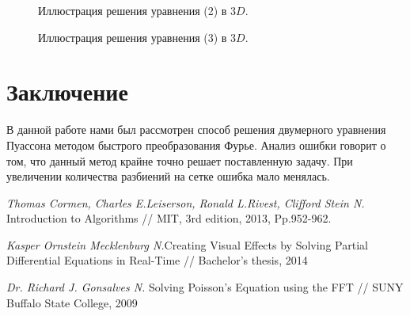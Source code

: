 \documentclass[a4paper,12pt]{article}
\theoremstyle{plain} %
\theoremstyle{definition} %
\theoremstyle{remark} %
\theoremstyle{definition}
\theoremstyle{definition}
\begin{document}
		 	\begin{figure}[H]
		 	\caption{Иллюстрация решения уравнения (2) в $\textit{3D}$.}
		 \end{figure}
		 
		 	\begin{figure}[H]
		 	\caption{Иллюстрация решения уравнения (3) в $\textit{3D}$.}
		 \end{figure}
		 
	\newpage
	\section{Заключение}
	
	В данной работе нами был рассмотрен способ решения двумерного уравнения Пуассона методом быстрого преобразования Фурье. Анализ ошибки говорит о том, что данный метод крайне точно решает поставленную задачу. При увеличении количества разбиений на сетке ошибка мало менялась.  
	
	\begin{thebibliography}{3} 
		 \textit{Thomas Cormen, Charles E.Leiserson, Ronald L.Rivest, Clifford Stein N.} Introduction to Algorithms // MIT, 3rd edition, 2013, Pp.952-962.
		
		 \textit{Kasper Ornstein Mecklenburg N.}Creating Visual Effects by Solving Partial Differential Equations in Real-Time // Bachelor's thesis, 2014
		
		 \textit{Dr. Richard J. Gonsalves N.} Solving Poisson's Equation using the FFT // SUNY Buffalo State College, 2009 
	\end{thebibliography}
	
 
\end{document}
